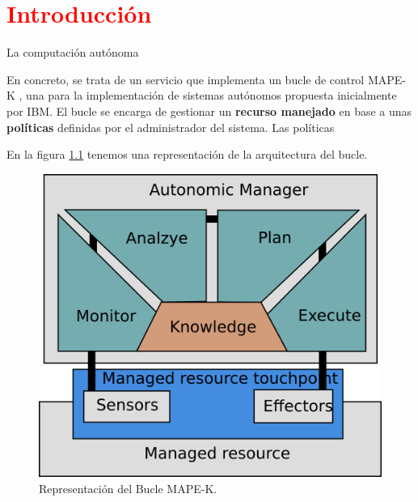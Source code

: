 
\chapter{\textcolor{red}{Introducción}}
\label{chap:introduccion}


La computación autónoma


En concreto, se trata de un servicio que implementa un bucle de control MAPE-K \cite{ArchitecturalBlueprintAutonomic2006, fonsServiciosAdaptivereadyPara2021}, una para la implementación de sistemas autónomos propuesta inicialmente por IBM. El bucle se encarga de gestionar un \textbf{recurso manejado} en base a unas \textbf{políticas} definidas por el administrador del sistema. Las políticas

En la figura \ref{fig:bucle-mapek} tenemos una representación de la arquitectura del bucle.

\begin{figure}[h]
  \centering
  \includegraphics{01_introduccion/images/bucle-mape-k.png}
  \caption[Representación del Bucle MAPE-K]{Representación del Bucle MAPE-K.\footnotemark}
  \label{fig:bucle-mapek}
\end{figure}

